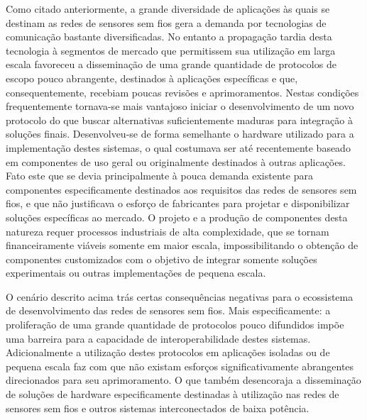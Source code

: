 \documentclass[
	12pt,				%
	openright,			%
	oneside,
	a4paper,			%
	english,			%
	french,				%
	spanish,			%
	brazil				%
	]{abntex2}
\begin{document}
Como citado anteriormente, a grande diversidade de aplicações às quais se destinam as redes de sensores sem fios gera a demanda por tecnologias de comunicação bastante diversificadas. No entanto a propagação tardia desta tecnologia à segmentos de mercado que permitissem sua utilização em larga escala favoreceu a disseminação de uma grande quantidade de protocolos de escopo pouco abrangente, destinados à aplicações específicas e que, consequentemente, recebiam poucas revisões e aprimoramentos. Nestas condições frequentemente tornava-se mais vantajoso iniciar o desenvolvimento de um novo protocolo do que buscar alternativas suficientemente maduras para integração à soluções finais. Desenvolveu-se de forma semelhante o hardware utilizado para a implementação destes sistemas, o qual costumava ser até recentemente baseado em componentes de uso geral ou originalmente destinados à outras aplicações. Fato este que se devia principalmente à pouca demanda existente para componentes especificamente destinados aos requisitos das redes de sensores sem fios, e que não justificava o esforço de fabricantes para projetar e disponibilizar soluções específicas ao mercado. O projeto e a produção de componentes desta natureza requer processos industriais de alta complexidade, que se tornam financeiramente viáveis somente em maior escala, impossibilitando o obtenção de componentes customizados com o objetivo de integrar somente soluções experimentais ou outras implementações de pequena escala.

O cenário descrito acima trás certas consequências negativas para o ecossistema de desenvolvimento das redes de sensores sem fios. Mais especificamente: a proliferação de uma grande quantidade de protocolos pouco difundidos impõe uma barreira para a capacidade de interoperabilidade destes sistemas. Adicionalmente a utilização destes protocolos em aplicações isoladas ou de pequena escala faz com que não existam esforços significativamente abrangentes direcionados para seu aprimoramento. O que também desencoraja a disseminação de soluções de hardware especificamente destinadas à utilização nas redes de sensores sem fios e outros sistemas interconectados de baixa potência.
\end{document}
